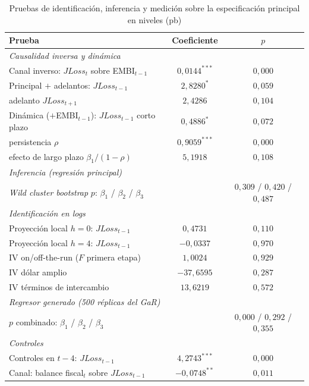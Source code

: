 \begin{table}[htbp]
\centering
\footnotesize
\caption[Pruebas de identificación, inferencia y medición]{Pruebas de identificación, inferencia y medición sobre la especificación principal en niveles (pb)}
\label{tab:arbitro-nivlag}
\begin{tabular}{lcc}
\toprule
Prueba & Coeficiente & $p$ \\
\midrule
\multicolumn{3}{l}{\textit{Causalidad inversa y dinámica}} \\
Canal inverso: $JLoss_t$ sobre EMBI$_{t-1}$ & $0{,}0144^{***}$ & $0{,}000$ \\
Principal $+$ adelantos: $JLoss_{t-1}$ & $2{,}8280^{*}$ & $0{,}059$ \\
\quad adelanto $JLoss_{t+1}$ & $2{,}4286$ & $0{,}104$ \\
Dinámica ($+$EMBI$_{t-1}$): $JLoss_{t-1}$ corto plazo & $0{,}4886^{*}$ & $0{,}072$ \\
\quad persistencia $\rho$ & $0{,}9059^{***}$ & $0{,}000$ \\
\quad efecto de largo plazo $\beta_1/(1-\rho)$ & $5{,}1918$ & $0{,}108$ \\
\multicolumn{3}{l}{\textit{Inferencia (regresión principal)}} \\
\textit{Wild cluster bootstrap} $p$: $\beta_1$ / $\beta_2$ / $\beta_3$ & & $0{,}309$ / $0{,}420$ / $0{,}487$ \\
\multicolumn{3}{l}{\textit{Identificación en logs}} \\
Proyección local $h=0$: $JLoss_{t-1}$ & $0{,}4731$ & $0{,}110$ \\
Proyección local $h=4$: $JLoss_{t-1}$ & $-0{,}0337$ & $0{,}970$ \\
IV on/off-the-run ($F$ primera etapa) & $1{,}0024$ \;[$F=16{,}0$] & $0{,}929$ \\
IV dólar amplio & $-37{,}6595$ \;[$F=10{,}2$] & $0{,}287$ \\
IV términos de intercambio & $13{,}6219$ \;[$F=1{,}5$] & $0{,}572$ \\
\multicolumn{3}{l}{\textit{Regresor generado (500 réplicas del GaR)}} \\
$p$ combinado: $\beta_1$ / $\beta_2$ / $\beta_3$ & & $0{,}000$ / $0{,}292$ / $0{,}355$ \\
\multicolumn{3}{l}{\textit{Controles}} \\
Controles en $t-4$: $JLoss_{t-1}$ & $4{,}2743^{***}$ & $0{,}000$ \\
Canal: balance fiscal$_t$ sobre $JLoss_{t-1}$ & $-0{,}0748^{**}$ & $0{,}011$ \\

\end{tabular}
\end{table}
